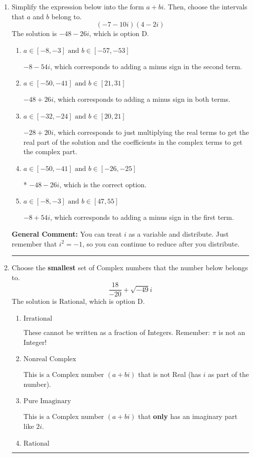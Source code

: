 \documentclass{extbook}[14pt]
\newcommand{\litem}[1]{\item #1

\rule{\textwidth}{0.4pt}}
\begin{document}
\begin{enumerate}\litem{
Simplify the expression below into the form $a+bi$. Then, choose the intervals that $a$ and $b$ belong to.
\[ (-7 - 10 i)(4 - 2 i) \]
The solution is \( -48 - 26 i \), which is option D.\begin{enumerate}[label=\Alph*.]
\item \( a \in [-8, -3] \text{ and } b \in [-57, -53] \)

 $-8 - 54 i$, which corresponds to adding a minus sign in the second term.
\item \( a \in [-50, -41] \text{ and } b \in [21, 31] \)

 $-48 + 26 i$, which corresponds to adding a minus sign in both terms.
\item \( a \in [-32, -24] \text{ and } b \in [20, 21] \)

 $-28 + 20 i$, which corresponds to just multiplying the real terms to get the real part of the solution and the coefficients in the complex terms to get the complex part.
\item \( a \in [-50, -41] \text{ and } b \in [-26, -25] \)

* $-48 - 26 i$, which is the correct option.
\item \( a \in [-8, -3] \text{ and } b \in [47, 55] \)

 $-8 + 54 i$, which corresponds to adding a minus sign in the first term.
\end{enumerate}

\textbf{General Comment:} You can treat $i$ as a variable and distribute. Just remember that $i^2=-1$, so you can continue to reduce after you distribute.
}
\litem{
Choose the \textbf{smallest} set of Complex numbers that the number below belongs to.
\[ \frac{18}{-20}+\sqrt{-49}i \]
The solution is \( \text{Rational} \), which is option D.\begin{enumerate}[label=\Alph*.]
\item \( \text{Irrational} \)

These cannot be written as a fraction of Integers. Remember: $\pi$ is not an Integer!
\item \( \text{Nonreal Complex} \)

This is a Complex number $(a+bi)$ that is not Real (has $i$ as part of the number).
\item \( \text{Pure Imaginary} \)

This is a Complex number $(a+bi)$ that \textbf{only} has an imaginary part like $2i$.
\item \( \text{Rational} \)


\end{enumerate}}
\end{enumerate}
\end{document}
